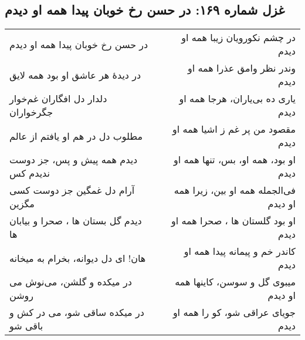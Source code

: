 \begin{center}
\section*{غزل شماره ۱۶۹: در حسن رخ خوبان پیدا همه او دیدم}
\label{sec:169}
\begin{longtable}{l p{0.5cm} r}
در حسن رخ خوبان پیدا همه او دیدم
&&
در چشم نکورویان زیبا همه او دیدم
\\
در دیدهٔ هر عاشق او بود همه لایق
&&
وندر نظر وامق عذرا همه او دیدم
\\
دلدار دل افگاران غم‌خوار جگرخواران
&&
یاری ده بی‌یاران، هرجا همه او دیدم
\\
مطلوب دل در هم او یافتم از عالم
&&
مقصود من پر غم ز اشیا همه او دیدم
\\
دیدم همه پیش و پس، جز دوست ندیدم کس
&&
او بود، همه او، بس، تنها همه او دیدم
\\
آرام دل غمگین جز دوست کسی مگزین
&&
فی‌الجمله همه او بین، زیرا همه او دیدم
\\
دیدم گل بستان ها ، صحرا و بیابان ها
&&
او بود گلستان ها ، صحرا همه او دیدم
\\
هان! ای دل دیوانه، بخرام به میخانه
&&
کاندر خم و پیمانه پیدا همه او دیدم
\\
در میکده و گلشن، می‌نوش می روشن
&&
میبوی گل و سوسن، کاینها همه او دیدم
\\
در میکده ساقی شو، می در کش و باقی شو
&&
جویای عراقی شو، کو را همه او دیدم
\\
\end{longtable}
\end{center}
